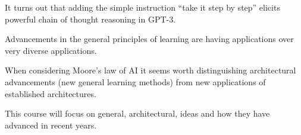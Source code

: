 {

It turns out that adding the simple instruction ``take it step by step'' elicits powerful chain of thought reasoning in GPT-3.


Advancements in the general principles of learning are having applications over very diverse applications.

\vfill
When considering Moore's law of AI it seems worth distinguishing architectural advancements (new general learning methods)
from new applications of established architectures.

\vfill
This course will focus on general, architectural, ideas and how they have advanced in recent years.


}

